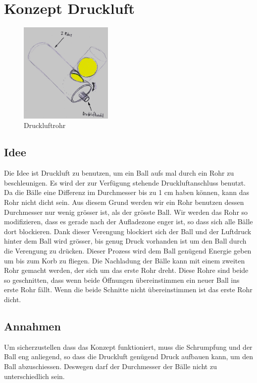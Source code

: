 \section{Konzept Druckluft}
\begin{figure}[h!]
	\centering
	\includegraphics[width=0.4\textwidth]{../../fig/Druckluftrohr.jpg}
	\caption{Druckluftrohr}
	\label{fig:druckluftrohr}
\end{figure}

\subsection{Idee}
Die Idee ist Druckluft zu benutzen, um ein Ball aufs mal durch ein Rohr zu beschleunigen. Es wird der zur Verfügung stehende Druckluftanschluss benutzt. Da die Bälle eine Differenz im Durchmesser bis zu 1 cm haben können, kann das Rohr nicht dicht sein. Aus diesem Grund werden wir ein Rohr benutzen dessen Durchmesser nur wenig grösser ist, als der grösste Ball. Wir werden das Rohr so modifizieren, dass es gerade nach der Aufladezone enger ist, so dass sich alle Bälle dort blockieren. Dank dieser Verengung blockiert sich der Ball und der Luftdruck hinter dem Ball wird grösser, bis genug Druck vorhanden ist um den Ball durch die Verengung zu drücken. Dieser Prozess wird dem Ball genügend Energie geben um bis zum Korb zu fliegen.
Die Nachladung der Bälle kann mit einem zweiten Rohr gemacht werden, der sich um das erste Rohr dreht. Diese Rohre sind beide so geschnitten, dass wenn beide Öffnungen übereinstimmen ein neuer Ball ins erste Rohr fällt. Wenn die beide Schnitte nicht übereinstimmen ist das erste Rohr dicht.

\subsection{Annahmen}
Um sicherzustellen dass das Konzept funktioniert, muss die Schrumpfung und der Ball eng anliegend, so dass die Druckluft genügend Druck aufbauen kann, um den Ball abzuschiessen. Deswegen darf der Durchmesser der Bälle nicht zu unterschiedlich sein. 

